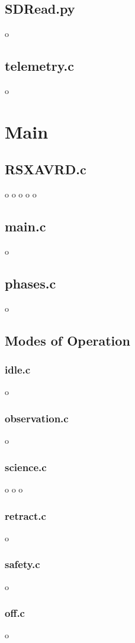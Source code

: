 \documentclass[letterpaper,10pt]{article}
\begin{document}
\subsection{SDRead.py}
\clearpage
o
\clearpage
\subsection{telemetry.c}
\clearpage
o
\clearpage

\section{Main}
\subsection{RSXAVRD.c}
\clearpage
o
\clearpage
o
\clearpage
o
\clearpage
o
\clearpage
o
\clearpage
\subsection{main.c}
\clearpage
o
\clearpage
\subsection{phases.c}
\clearpage
o
\clearpage
\subsection{Modes of Operation}
\subsubsection{idle.c}
\clearpage
o
\clearpage
\subsubsection{observation.c}
\clearpage
o
\clearpage
\subsubsection{science.c}
\clearpage
o
\clearpage
o
\clearpage
o
\clearpage
\subsubsection{retract.c}
\clearpage
o
\clearpage
\subsubsection{safety.c}
\clearpage
o
\clearpage
\subsubsection{off.c}
\clearpage
o
\clearpage
\end{document}
